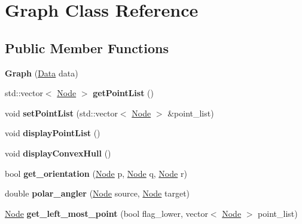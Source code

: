 \hypertarget{classGraph}{}\section{Graph Class Reference}
\label{classGraph}
\subsection*{Public Member Functions}
\begin{DoxyCompactItemize}
\item 
\mbox{\label{classGraph_ad2e96f43e60cd916a3bccab231fc7570}} 
{\bfseries Graph} (\hyperlink{classData}{Data} data)
\item 
\mbox{\label{classGraph_a8231d26a14b98e1b745dc589206288f0}} 
std\+::vector$<$ \hyperlink{classNode}{Node} $>$ {\bfseries get\+Point\+List} ()
\item 
\mbox{\label{classGraph_ac3d8fd4be7db3fd814b68499322b9cba}} 
void {\bfseries set\+Point\+List} (std\+::vector$<$ \hyperlink{classNode}{Node} $>$ \&point\+\_\+list)
\item 
\mbox{\label{classGraph_af17d100a4c98374793b04f7eb57532d4}} 
void {\bfseries display\+Point\+List} ()
\item 
\mbox{\label{classGraph_a76a6670d6c92e56bfc20a3d581a633ff}} 
void {\bfseries display\+Convex\+Hull} ()
\item 
\mbox{\label{classGraph_a657f8174fb95bd7bfd99556cfb4cbd65}} 
bool {\bfseries get\+\_\+orientation} (\hyperlink{classNode}{Node} p, \hyperlink{classNode}{Node} q, \hyperlink{classNode}{Node} r)
\item 
\mbox{\label{classGraph_af62998005ee35671342b379af7400b1b}} 
double {\bfseries polar\+\_\+angler} (\hyperlink{classNode}{Node} source, \hyperlink{classNode}{Node} target)
\item 
\mbox{\label{classGraph_af87a876de5bf77e8acc6c1e646c48472}} 
\hyperlink{classNode}{Node} {\bfseries get\+\_\+left\+\_\+most\+\_\+point} (bool flag\+\_\+lower, vector$<$ \hyperlink{classNode}{Node} $>$ point\+\_\+list)
\item 

\end{DoxyCompactItemize}
